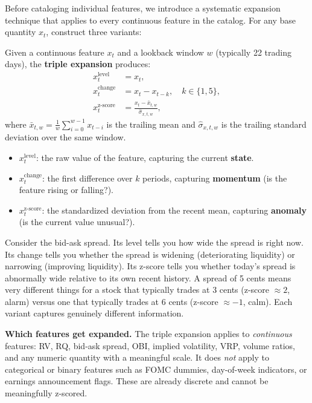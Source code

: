 Before cataloging individual features, we introduce a systematic expansion technique that applies to every continuous feature in the catalog.
For any base quantity $x_t$, construct three variants:

\begin{definition}
Given a continuous feature $x_t$ and a lookback window $w$ (typically 22 trading days), the \textbf{triple expansion} produces:
\begin{align}
x_t^{\text{level}} &= x_t, \label{eq:triple-level}\\
x_t^{\text{change}} &= x_t - x_{t-k}, \quad k \in \{1, 5\}, \label{eq:triple-change}\\
x_t^{\text{z-score}} &= \frac{x_t - \bar{x}_{t,w}}{\hat{\sigma}_{x,t,w}}, \label{eq:triple-zscore}
\end{align}
where $\bar{x}_{t,w} = \frac{1}{w}\sum_{i=0}^{w-1} x_{t-i}$ is the trailing mean and $\hat{\sigma}_{x,t,w}$ is the trailing standard deviation over the same window.
\end{definition}

\begin{itemize}[nosep]
  \item $x_t^{\text{level}}$: the raw value of the feature, capturing the current \textbf{state}.
  \item $x_t^{\text{change}}$: the first difference over $k$ periods, capturing \textbf{momentum} (is the feature rising or falling?).
  \item $x_t^{\text{z-score}}$: the standardized deviation from the recent mean, capturing \textbf{anomaly} (is the current value unusual?).
\end{itemize}

\begin{intuition}
Consider the bid-ask spread. Its level tells you how wide the spread is right now. Its change tells you whether the spread is widening (deteriorating liquidity) or narrowing (improving liquidity). Its z-score tells you whether today's spread is abnormally wide relative to its own recent history. A spread of 5 cents means very different things for a stock that typically trades at 3 cents (z-score $\approx 2$, alarm) versus one that typically trades at 6 cents (z-score $\approx -1$, calm). Each variant captures genuinely different information.
\end{intuition}

\textbf{Which features get expanded.}
The triple expansion applies to \emph{continuous} features: RV, RQ, bid-ask spread, OBI, implied volatility, VRP, volume ratios, and any numeric quantity with a meaningful scale.
It does \emph{not} apply to categorical or binary features such as FOMC dummies, day-of-week indicators, or earnings announcement flags.
These are already discrete and cannot be meaningfully z-scored.

